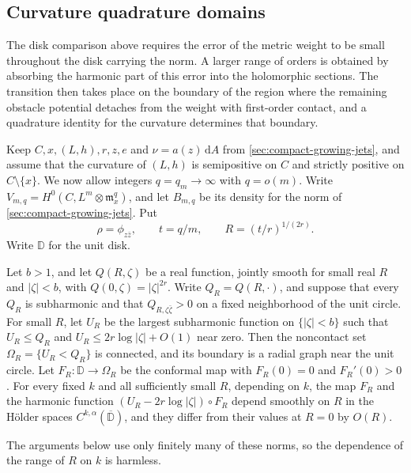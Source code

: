\subsection{Curvature quadrature domains}
\label{sec:curvature-quadrature-jets}

The disk comparison above requires the error of the metric weight to be small throughout the disk carrying the norm. A larger range of orders is obtained by absorbing the harmonic part of this error into the holomorphic sections. The transition then takes place on the boundary of the region where the remaining obstacle potential detaches from the weight with first-order contact, and a quadrature identity for the curvature determines that boundary.

Keep $C,x,(L,h),r,z,e$ and $\nu=a(z)\,\mathrm{d}A$ from \cref{sec:compact-growing-jets}, and assume that the curvature of $(L,h)$ is semipositive on $C$ and strictly positive on $C\setminus\{x\}$. We now allow integers $q=q_m\to\infty$ with $q=o(m)$. Write $V_{m,q}=H^0(C,L^m\otimes\mathfrak m_x^q)$, and let $B_{m,q}$ be its density for the norm of \cref{sec:compact-growing-jets}. Put
\[
 \rho=\phi_{z\bar z},\qquad t=q/m,\qquad R=(t/r)^{1/(2r)}.
\]
Write $\mathbb D$ for the unit disk.

\begin{lemma}\label{lem:curvature-quadrature-domain}
Let $b>1$, and let $Q(R,\zeta)$ be a real function, jointly smooth for small real $R$ and $|\zeta|<b$, with $Q(0,\zeta)=|\zeta|^{2r}$. Write $Q_R=Q(R,\cdot)$, and suppose that every $Q_R$ is subharmonic and that $Q_{R,\zeta\bar\zeta}>0$ on a fixed neighborhood of the unit circle. For small $R$, let $U_R$ be the largest subharmonic function on $\{|\zeta|<b\}$ such that $U_R\leq Q_R$ and $U_R\leq2r\log|\zeta|+O(1)$ near zero. Then the noncontact set $\Omega_R=\{U_R<Q_R\}$ is connected, and its boundary is a radial graph near the unit circle. Let $F_R:\mathbb D\to\Omega_R$ be the conformal map with $F_R(0)=0$ and $F_R'(0)>0$. For every fixed $k$ and all sufficiently small $R$, depending on $k$, the map $F_R$ and the harmonic function $(U_R-2r\log|\zeta|)\circ F_R$ depend smoothly on $R$ in the H\"older spaces $C^{k,\alpha}(\overline{\mathbb D})$, and they differ from their values at $R=0$ by $O(R)$.
\end{lemma}

The arguments below use only finitely many of these norms, so the dependence of the range of $R$ on $k$ is harmless.

